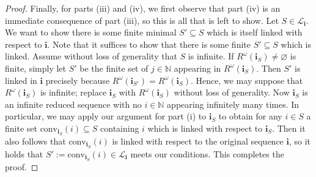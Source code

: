 \documentclass[10pt,a4paper]{amsart}
\newcommand{\NN}{\mathbb{N}}
\begin{document}
\begin{proof}
    Finally, for parts (iii) and (iv), we first observe that part (iv) is an immediate consequence of part (iii), so this is all that is left to show. Let $S\in\mathcal L_\mathbf i$. We want to show there is some finite minimal $S'\subseteq S$ which is itself linked with respect to $\mathbf i$. Note that it suffices to show that there is some finite $S'\subseteq S$ which is linked. Assume without loss of generality that $S$ is infinite. If $R^\omega(\mathbf i_S)\neq\varnothing$ is finite, simply let $S'$ be the finite set of $j\in\NN$ appearing in $R^\omega(\mathbf i_S)$. Then $S'$ is linked in $\mathbf i$ precisely because $R^\omega(\mathbf i_{S'})=R^\omega(\mathbf i_S)$. Hence, we may suppose that $R^\omega(\mathbf i_S)$ is infinite; replace $\mathbf i_S$ with $R^\omega(\mathbf i_S)$ without loss of generality. Now $\mathbf i_S$ is an infinite reduced sequence with no $i\in\NN$ appearing infinitely many times. In particular, we may apply our argument for part (i) to $\mathbf i_S$ to obtain for any $i\in S$ a finite set $\text{conv}_{\mathbf i_S}(i)\subseteq S$ containing $i$ which is linked with respect to $\mathbf i_S$. Then it also follows that $\text{conv}_{\mathbf i_S}(i)$ is linked with respect to the original sequence $\mathbf i$, so it holds that $S':=\text{conv}_{\mathbf i_S}(i)\in\mathcal L_\mathbf i$ meets our conditions. This completes the proof.
\end{proof}
\end{document}
